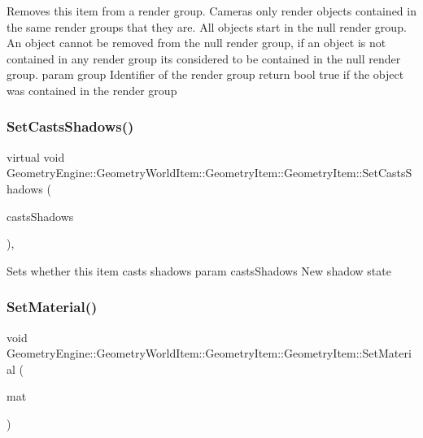Removes this item from a render group. Cameras only render objects contained in the same render groups that they are. All objects start in the null render group. An object cannot be removed from the null render group, if an object is not contained in any render group it\textquotesingle{}s considered to be contained in the null render group. param group Identifier of the render group return bool true if the object was contained in the render group \mbox{\label{class_geometry_engine_1_1_geometry_world_item_1_1_geometry_item_1_1_geometry_item_a3851222930b03bafdf0338df339022d2}} 
\subsubsection{\texorpdfstring{SetCastsShadows()}{SetCastsShadows()}}
{\footnotesize\ttfamily virtual void Geometry\+Engine\+::\+Geometry\+World\+Item\+::\+Geometry\+Item\+::\+Geometry\+Item\+::\+Set\+Casts\+Shadows (\begin{DoxyParamCaption}\item[{bool}]{casts\+Shadows }\end{DoxyParamCaption})\hspace{0.3cm}{\ttfamily [inline]}, {\ttfamily [virtual]}}

Sets whether this item casts shadows param casts\+Shadows New shadow state \mbox{\label{class_geometry_engine_1_1_geometry_world_item_1_1_geometry_item_1_1_geometry_item_addd7b6651de0583209ec45ff1a813dd1}} 
\subsubsection{\texorpdfstring{SetMaterial()}{SetMaterial()}}
{\footnotesize\ttfamily void Geometry\+Engine\+::\+Geometry\+World\+Item\+::\+Geometry\+Item\+::\+Geometry\+Item\+::\+Set\+Material (\begin{DoxyParamCaption}\item[{\mbox{\hyperlink{class_geometry_engine_1_1_geometry_material_1_1_material}{Geometry\+Material\+::\+Material}} $\ast$}]{mat }\end{DoxyParamCaption})\hspace{0.3cm}{\ttfamily [virtual]}}

